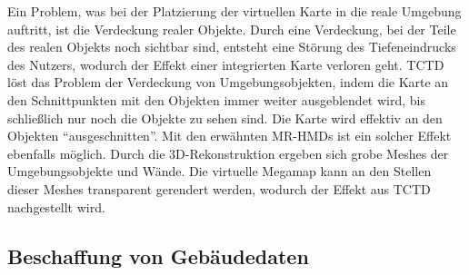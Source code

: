 Ein Problem, was bei der Platzierung der virtuellen Karte in die reale Umgebung auftritt, ist die Verdeckung realer Objekte.
Durch eine Verdeckung, bei der Teile des realen Objekts noch sichtbar sind, entsteht eine Störung des Tiefeneindrucks des Nutzers, wodurch der Effekt einer integrierten Karte verloren geht.
TCTD löst das Problem der Verdeckung von Umgebungsobjekten, indem die Karte an den Schnittpunkten mit den Objekten immer weiter ausgeblendet wird, bis schließlich nur noch die Objekte zu sehen sind.
Die Karte wird effektiv an den Objekten \enquote{ausgeschnitten}.
Mit den erwähnten MR-HMDs ist ein solcher Effekt ebenfalls möglich.
Durch die 3D-Rekonstruktion ergeben sich grobe Meshes der Umgebungsobjekte und Wände.
Die virtuelle Megamap kann an den Stellen dieser Meshes transparent gerendert werden, wodurch der Effekt aus TCTD nachgestellt wird.

\subsection{Beschaffung von Gebäudedaten}

%
\cleardoublepage
